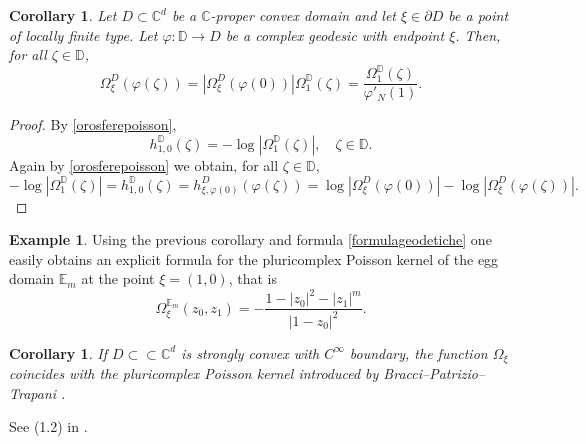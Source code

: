 \documentclass[11pt, reqno]{amsart}
\numberwithin{equation}{section}
\newtheorem{corollary}[theorem]{Corollary}
\theoremstyle{definition}
\newtheorem{example}[theorem]{Example}
\newcommand{\C}{\mathbb{C}}
\newcommand{\D}{\mathbb{D}}
\begin{document}
{{{		
		\begin{corollary}\label{forPoigeo}
			Let $D\subset\C^d$ be a $\C$-proper convex domain and let $\xi\in\partial D$ be a point of locally finite type. Let $\varphi\colon \D\to D$ be a complex geodesic with endpoint $\xi$.
			Then, for all $\zeta\in \D$,
			$$\Omega_\xi^D(\varphi(\zeta))= |\Omega_\xi^D(\varphi(0))|\Omega_1^\D(\zeta)= \frac{\Omega_1^\D(\zeta)}{\varphi'_N(1)}.$$
		\end{corollary}
		\begin{proof}
			By  \eqref{orosferepoisson}, $$h^\D_{1,0}(\zeta)=-\log|\Omega^\D_1(\zeta)|,\quad \zeta\in \D.$$
			Again by \eqref{orosferepoisson}  we obtain, for all $\zeta\in \D$,
			$$-\log|\Omega^\D_1(\zeta)|= h^\D_{1,0}(\zeta)=h^D_{\xi,\varphi(0)}(\varphi(\zeta))=\log|\Omega^D_\xi(\varphi(0))|-\log|\Omega^D_\xi(\varphi(\zeta))|.$$
		\end{proof}
		
		
		\begin{example}\label{poisegg}
			Using the previous corollary and  formula \eqref{formulageodetiche}  one easily obtains an explicit formula for the pluricomplex Poisson kernel of the egg domain $\mathbb{E}_m$ at the point $\xi=(1,0)$, that is
			$$\Omega^{\mathbb{E}_m}_\xi(z_0,z_1)=-\frac{1-|z_0|^2-|z_1|^m}{|1-z_0|^2}.$$
		\end{example}
		
		
		\begin{corollary}
			If $D\subset\subset \C^d$ is strongly convex with $C^\infty$ boundary, the function $\Omega_\xi$ coincides with the pluricomplex Poisson kernel introduced by Bracci--Patrizio--Trapani \cite{BP,BPT}. 
		\end{corollary}
		\proof
		See (1.2) in \cite{BPT}.
		\endproof
		
}}}
\end{document}
